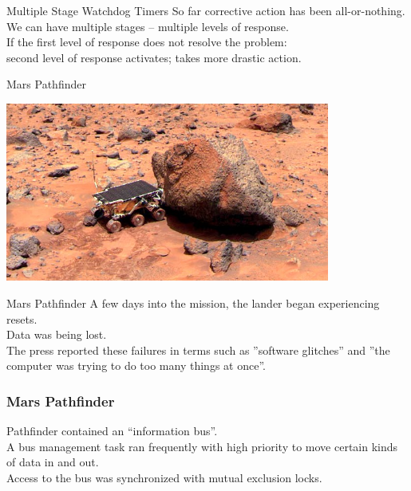\documentclass[aspectratio=169]{beamer}
\begin{document}
\begin{frame}{Multiple Stage Watchdog Timers}
\large
So far corrective action has been all-or-nothing. \\
\vspace{1em}
We can have multiple stages -- multiple levels of response. \\
\vspace{1em}
If the first level of response does not resolve the problem: \\
\quad second level of response activates; takes more drastic action. 
\end{frame}




\begin{frame}{Mars Pathfinder}
\begin{center}
	\includegraphics[width=0.8\textwidth]{img/Pathfinder01.jpg}
\end{center}
\end{frame}




\begin{frame}{Mars Pathfinder}
\large
A few days into the mission, the lander began experiencing resets. \\
\vspace{1em}
Data was being lost. \\
\vspace{1em}
The press reported these failures in terms such as ''software glitches'' and ''the computer was trying to do too many things at once''.
\end{frame}




\begin{frame}
\frametitle{Mars Pathfinder}
\large
Pathfinder contained an ``information bus''. \\
\vspace{1em}
A bus management task ran frequently with high priority to move certain kinds of data in and out. \\
\vspace{1em}
Access to the bus was synchronized with mutual exclusion locks. \\
\end{frame}
\end{document}
